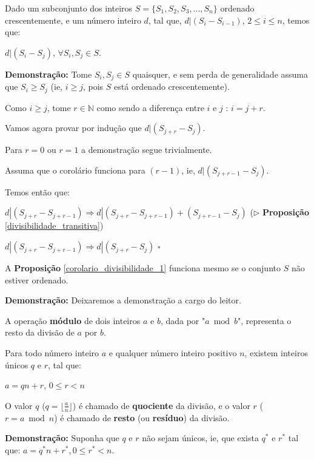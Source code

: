 \begin{proposition}\label{corolario_divisibilidade_1}
Dado um subconjunto dos inteiros $S = \{S_1, S_2, S_3, ..., S_n\}$ ordenado crescentemente, e um número inteiro $d$, tal que, $d|(S_i-S_{i-1})$, $2 \leq i \leq n$, 
temos que: 

$d|(S_i-S_j)$, $\forall S_i, S_j \in S$.

\end{proposition}
\textbf{Demonstração:}
Tome $S_i,S_j \in S$ quaisquer, e sem perda de generalidade assuma que $S_i \geq S_j$ (ie, $i \geq j$, pois $S$ está ordenado crescentemente).

Como $i \geq j$, tome $r \in \mathbb{N}$ como sendo a diferença entre $i$ e $j$ : $i = j + r$.

Vamos agora provar por indução que $d|(S_{j+r}-S_j)$.

Para $r=0$ ou $r=1$ a demonstração segue trivialmente.

Assuma que o corolário funciona para $(r-1)$, ie, $d|(S_{j+r-1}-S_j)$. 

Temos então que: 

$d|(S_{j+r}-S_{j+r-1}) \Rightarrow d|(S_{j+r}-S_{j+r-1})+(S_{j+r-1}-S_j)$ ($\triangleright$ \textbf{Proposição} \autoref{divisibilidade_transitiva})

$d|(S_{j+r}-S_{j+r-1}) \Rightarrow d|(S_{j+r}-S_j)$ $\square$ 


\begin{proposition}\label{corolario_divisibilidade_1.1}
A \textbf{Proposição} \autoref{corolario_divisibilidade_1} funciona mesmo se o conjunto $S$ não estiver ordenado.
\end{proposition}
\textbf{Demonstração:}
Deixaremos a demonstração a cargo do leitor.
\newline

\begin{definition}
A operação \textbf{módulo} de dois inteiros $a$ e $b$, dada por "$a \bmod b$", representa o resto da divisão de $a$ por $b$.
\end{definition}

\begin{theorem}\label{algoritmo_divisao}
Para todo número inteiro $a$ e qualquer número inteiro positivo $n$, existem inteiros únicos $q$ e $r$, tal que:

$a = qn + r$, $0 \leq r < n$

O valor $q$ ($q = \lfloor  \frac{a}{n} \rfloor$) é chamado de \textbf{quociente} da divisão, e o valor $r$ ($r = a \bmod n$) é chamado de \textbf{resto}
(ou \textbf{resíduo}) da divisão.
\end{theorem}
\textbf{Demonstração:}
Suponha que $q$ e $r$ não sejam únicos, ie, que exista $q^*$ e $r^*$ tal que: $a = q^*n + r^*, 0 \leq r^* < n$.

